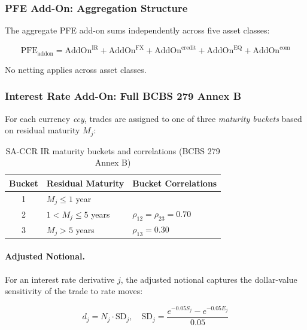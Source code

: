 \documentclass[11pt,a4paper]{article}
\begin{document}
\subsubsection{PFE Add-On: Aggregation Structure}

The aggregate PFE add-on sums independently across five asset classes:

\begin{equation}
  \text{PFE}_{\text{addon}} = \text{AddOn}^{\text{IR}}
    + \text{AddOn}^{\text{FX}}
    + \text{AddOn}^{\text{credit}}
    + \text{AddOn}^{\text{EQ}}
    + \text{AddOn}^{\text{com}}
  \label{eq:pfe_addon}
\end{equation}

No netting applies across asset classes.

\subsubsection{Interest Rate Add-On: Full BCBS 279 Annex B}
\label{sec:ir_addon}

For each currency \textit{ccy}, trades are assigned to one of three
\emph{maturity buckets} based on residual maturity $M_j$:

\begin{table}[h!]
\centering
\begin{tabular}{@{}cll@{}}
\toprule
\textbf{Bucket} & \textbf{Residual Maturity} & \textbf{Bucket Correlations} \\
\midrule
1 & $M_j \leq 1$ year & \\
2 & $1 < M_j \leq 5$ years & $\rho_{12} = \rho_{23} = 0.70$ \\
3 & $M_j > 5$ years & $\rho_{13} = 0.30$ \\
\bottomrule
\end{tabular}
\caption{SA-CCR IR maturity buckets and correlations (BCBS 279 Annex B)}
\end{table}

\paragraph{Adjusted Notional.}
For an interest rate derivative $j$, the adjusted notional captures the
dollar-value sensitivity of the trade to rate moves:

\begin{equation}
  d_j = N_j \cdot \text{SD}_j,
  \quad
  \text{SD}_j = \frac{e^{-0.05 S_j} - e^{-0.05 E_j}}{0.05}
  \label{eq:adj_notional}
\end{equation}
\end{document}
